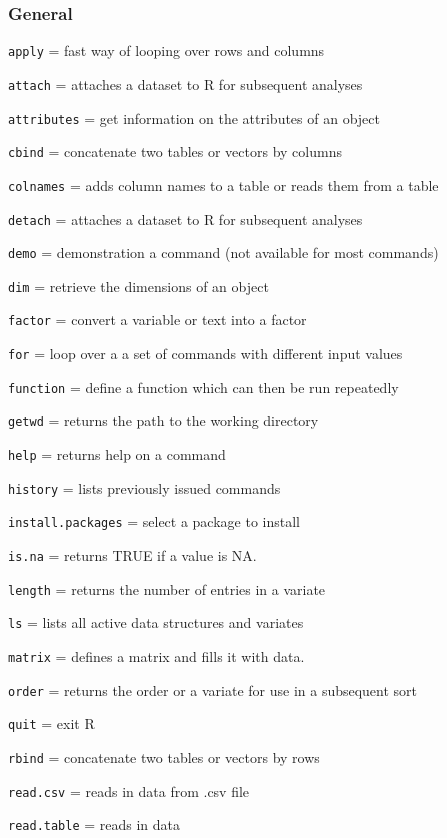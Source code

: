 \documentclass[
]{book}
\begin{document}
\hypertarget{general}{%
\subsubsection{General}\label{general}}

\texttt{apply} = fast way of looping over rows and columns

\texttt{attach} = attaches a dataset to R for subsequent analyses

\texttt{attributes} = get information on the attributes of an object

\texttt{cbind} = concatenate two tables or vectors by columns

\texttt{colnames} = adds column names to a table or reads them from a table

\texttt{detach} = attaches a dataset to R for subsequent analyses

\texttt{demo} = demonstration a command (not available for most commands)

\texttt{dim} = retrieve the dimensions of an object

\texttt{factor} = convert a variable or text into a factor

\texttt{for} = loop over a a set of commands with different input values

\texttt{function} = define a function which can then be run repeatedly

\texttt{getwd} = returns the path to the working directory

\texttt{help} = returns help on a command

\texttt{history} = lists previously issued commands

\texttt{install.packages} = select a package to install

\texttt{is.na} = returns TRUE if a value is NA.

\texttt{length} = returns the number of entries in a variate

\texttt{ls} = lists all active data structures and variates

\texttt{matrix} = defines a matrix and fills it with data.

\texttt{order} = returns the order or a variate for use in a subsequent sort

\texttt{quit} = exit R

\texttt{rbind} = concatenate two tables or vectors by rows

\texttt{read.csv} = reads in data from .csv file

\texttt{read.table} = reads in data
\end{document}
